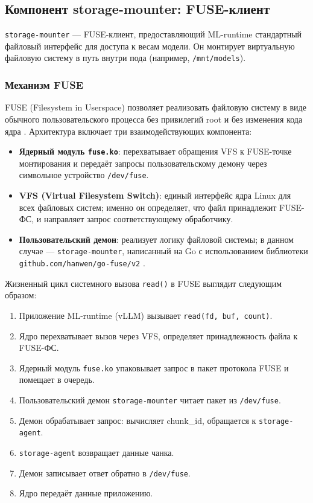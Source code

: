 \subsection{Компонент storage-mounter: FUSE-клиент}

\texttt{storage-mounter} --- FUSE-клиент, предоставляющий ML-runtime стандартный файловый интерфейс для доступа к весам модели. Он монтирует виртуальную файловую систему в путь внутри пода (например, \texttt{/mnt/models}).

\subsubsection{Механизм FUSE}

FUSE (Filesystem in Userspace) позволяет реализовать файловую систему в виде обычного пользовательского процесса без привилегий root и без изменения кода ядра \cite{fuse_kernel_docs}. Архитектура включает три взаимодействующих компонента:

\begin{itemize}[leftmargin=*]
  \item \textbf{Ядерный модуль \texttt{fuse.ko}}: перехватывает обращения VFS к FUSE-точке монтирования и передаёт запросы пользовательскому демону через символьное устройство \texttt{/dev/fuse}.
  \item \textbf{VFS (Virtual Filesystem Switch)}: единый интерфейс ядра Linux для всех файловых систем; именно он определяет, что файл принадлежит FUSE-ФС, и направляет запрос соответствующему обработчику.
  \item \textbf{Пользовательский демон}: реализует логику файловой системы; в данном случае --- \texttt{storage-mounter}, написанный на Go с использованием библиотеки \texttt{github.com/hanwen/go-fuse/v2} \cite{gofuse}.
\end{itemize}

Жизненный цикл системного вызова \texttt{read()} в FUSE выглядит следующим образом:
\begin{enumerate}[leftmargin=*]
  \item Приложение ML-runtime (vLLM) вызывает \texttt{read(fd, buf, count)}.
  \item Ядро перехватывает вызов через VFS, определяет принадлежность файла к FUSE-ФС.
  \item Ядерный модуль \texttt{fuse.ko} упаковывает запрос в пакет протокола FUSE и помещает в очередь.
  \item Пользовательский демон \texttt{storage-mounter} читает пакет из \texttt{/dev/fuse}.
  \item Демон обрабатывает запрос: вычисляет chunk\_id, обращается к \texttt{storage-agent}.
  \item \texttt{storage-agent} возвращает данные чанка.
  \item Демон записывает ответ обратно в \texttt{/dev/fuse}.
  \item Ядро передаёт данные приложению.
\end{enumerate}

